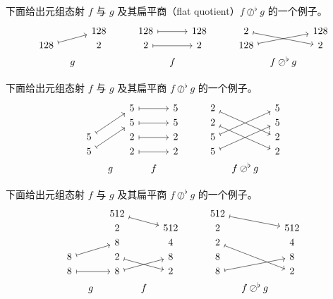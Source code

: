 \begin{example}
下面给出元组态射 $f$ 与 $g$ 及其扁平商（flat quotient）$f \oslash^\flat g$ 的一个例子。
    \[ \begin{tikzcd} [row sep = 1, column sep = 8]
     & & 128& & & 128 \ar[rr,mapsto] & & 128 & & & 2 \ar[drr,mapsto] & & 128\\
    128 \ar[rru,mapsto] & & 2 & & &  2 \ar[rr,mapsto] & & 2 & & & 128 \ar[urr,mapsto] & & 2\\
    & g & & & & & f & & & & & f \oslash^\flat g &
    \end{tikzcd} \]
\end{example}

\begin{example}
    下面给出元组态射 $f$ 与 $g$ 及其扁平商 $f \oslash^\flat g$ 的一个例子。
    \[ \begin{tikzcd} [row sep = 1, column sep = 8]
     & &  5 \ar[rr,mapsto] & & 5 & & & 2 \ar[ddrr,mapsto] & & 5\\
     & &  5 \ar[rr,mapsto] & & 5 & & & 2 \ar[ddrr,mapsto] & & 5\\
    5 \ar[uurr,mapsto] & &  2 \ar[rr,mapsto] & & 2 & & & 5 \ar[uurr,mapsto] & & 2\\
    5 \ar[uurr,mapsto] & &  2 \ar[rr,mapsto] & & 2 & & & 5 \ar[uurr,mapsto] & & 2\\
    & g & & f & & & & & f\oslash^\flat g &
    \end{tikzcd} \]
\end{example}

\begin{example}
   下面给出元组态射 $f$ 与 $g$ 及其扁平商 $f \oslash^\flat g$ 的一个例子。
    \[ \begin{tikzcd} [row sep = 1, column sep = 8]
    & & 512 \ar[drr,mapsto] & & & & & 512 \ar[drr,mapsto] & & \\
     & & 2 & & 512 & & & 2 & & 512\\
     & & 8  & & 4 & & & 2 \ar[ddrr,mapsto] & & 4\\
    8 \ar[urr,mapsto] & & 2  \ar[drr,mapsto]  & & 8 & & & 8 & & 8\\
    8 \ar[rr,mapsto] & & 8 \ar[urr,mapsto] & &  2 & & & 8 \ar[urr,mapsto]  & & 2\\
    & g & & f & & & &  & f \oslash^\flat g &
    \end{tikzcd} \]
\end{example}



